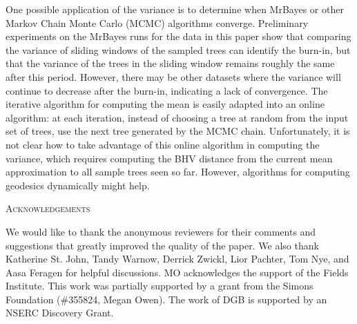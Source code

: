 \documentclass[12pt,letterpaper]{article}
\theoremstyle{plain}
\theoremstyle{definition}
\renewcommand{\section}[1]{%
\bigskip
\begin{center}
\begin{Large}
\normalfont\scshape #1
\medskip
\end{Large}
\end{center}}
\begin{document}
{%
One possible application of the variance is to determine when MrBayes or other Markov Chain Monte Carlo (MCMC) algorithms converge.  Preliminary experiments on the MrBayes runs for the data in this paper show that comparing the variance of sliding windows of the sampled trees can identify the burn-in, but that the variance of the trees in the sliding window remains roughly the same after this period. However, there may be other datasets where the variance will continue to decrease after the burn-in, indicating a lack of convergence.  The iterative algorithm for computing the mean is easily adapted into an online algorithm:  at each iteration, instead of choosing a  tree at random from the input set of trees, use the next tree generated by the MCMC chain.  Unfortunately, it is not clear how to take advantage of this online algorithm in computing the variance, which requires computing the BHV distance from the current mean approximation to all sample trees seen so far.  However, algorithms for computing geodesics dynamically \citep{SkwererProvan_dynamicgeos} might help.


\section{Acknowledgements}
We would like to thank the anonymous reviewers for their comments and suggestions that greatly improved the quality of the paper. We also thank Katherine St. John, Tandy Warnow, Derrick Zwickl, Lior Pachter, Tom Nye, and Aasa Feragen for helpful discussions.  MO acknowledges the support of the Fields Institute. This work was partially supported by a grant from the Simons Foundation (\#355824, Megan Owen).  The work of DGB is supported by an NSERC Discovery Grant.


\bigskip\bigskip





}
\end{document}
